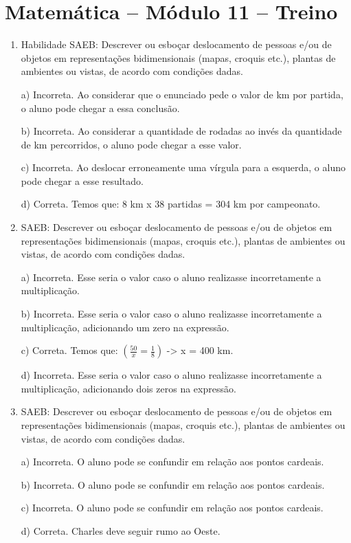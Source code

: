 \section*{Matemática – Módulo 11 – Treino}
\begin{enumerate}
\item Habilidade SAEB: Descrever ou esboçar deslocamento de pessoas e/ou de
objetos em representações bidimensionais (mapas, croquis etc.), plantas
de ambientes ou vistas, de acordo com condições dadas.

a) Incorreta. Ao considerar que o enunciado pede o valor de km por
partida, o aluno pode chegar a essa conclusão.

b) Incorreta. Ao considerar a quantidade de rodadas ao invés da
quantidade de km percorridos, o aluno pode chegar a esse valor.

c) Incorreta. Ao deslocar erroneamente uma vírgula para a
esquerda, o aluno pode chegar a esse resultado.

d) Correta. Temos que: 8 km x 38 partidas = 304 km por campeonato.
\item SAEB: Descrever ou esboçar deslocamento de pessoas e/ou de objetos em
representações bidimensionais (mapas, croquis etc.), plantas de
ambientes ou vistas, de acordo com condições dadas.

a) Incorreta. Esse seria o valor caso o aluno realizasse
incorretamente a multiplicação.

b) Incorreta. Esse seria o valor caso o aluno realizasse
incorretamente a multiplicação, adicionando um zero na expressão.

c) Correta. Temos que: $(\frac{50}{x} = \frac{1}{8})$ -> x = 400 km.

d) Incorreta. Esse seria o valor caso o aluno realizasse
incorretamente a multiplicação, adicionando dois zeros na expressão.
\item SAEB: Descrever ou esboçar deslocamento de pessoas e/ou de objetos em
representações bidimensionais (mapas, croquis etc.), plantas de
ambientes ou vistas, de acordo com condições dadas.

a) Incorreta. O aluno pode se confundir em relação aos pontos
cardeais.

b) Incorreta. O aluno pode se confundir em relação aos pontos
cardeais.

c) Incorreta. O aluno pode se confundir em relação aos pontos
cardeais.

d) Correta. Charles deve seguir rumo ao Oeste.
\end{enumerate}


